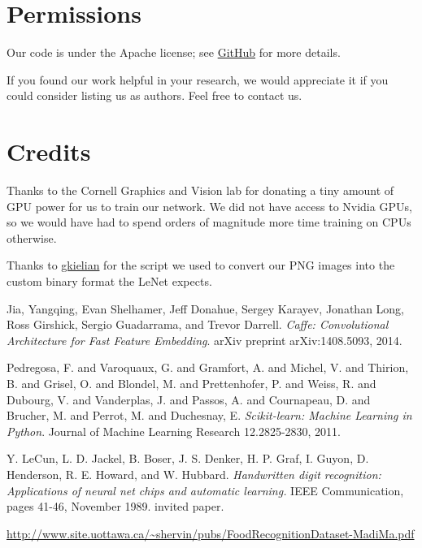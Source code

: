 \documentclass[leqno]{article}
\begin{document}
\section{Permissions}
Our code is under the Apache license; see
\href{http://github.com/darylsew/potato}{GitHub} for more details.

If you found our work helpful in your research, we would appreciate it if you could consider
listing us as authors. Feel free to contact us.

\section{Credits}
Thanks to the Cornell Graphics and Vision lab for donating a tiny amount of GPU
power for us to train our network. We did not have access to Nvidia GPUs, so we
would have had to spend orders of magnitude more time training on CPUs
otherwise.

Thanks to
\href{https://github.com/gskielian/JPG-PNG-to-MNIST-NN-Format/blob/master/LICENSE}{gkielian}
for the script we used to convert our PNG images into the custom binary format
the LeNet expects.

\begin{thebibliography}{9}
Jia, Yangqing, Evan Shelhamer, Jeff Donahue, Sergey Karayev, Jonathan Long, Ross Girshick, Sergio Guadarrama, and Trevor Darrell.
\textit{Caffe: Convolutional Architecture for Fast Feature Embedding}.
arXiv preprint arXiv:1408.5093, 2014.


Pedregosa, F. and Varoquaux, G. and Gramfort, A. and Michel, V.
         and Thirion, B. and Grisel, O. and Blondel, M. and Prettenhofer, P.
         and Weiss, R. and Dubourg, V. and Vanderplas, J. and Passos, A. and
         Cournapeau, D. and Brucher, M. and Perrot, M. and Duchesnay, E.
         \textit{Scikit-learn: Machine Learning in Python}. Journal of Machine
         Learning Research 12.2825-2830, 2011.

   Y. LeCun, L. D. Jackel, B. Boser, J. S. Denker, H. P. Graf, I. Guyon, D.
   Henderson, R. E. Howard, and W. Hubbard. \textit{Handwritten digit
   recognition: Applications of neural net chips and automatic learning.} IEEE Communication, pages 41-46, November 1989. invited paper.

 \url{http://www.site.uottawa.ca/~shervin/pubs/FoodRecognitionDataset-MadiMa.pdf}
\end{thebibliography}
\end{document}
